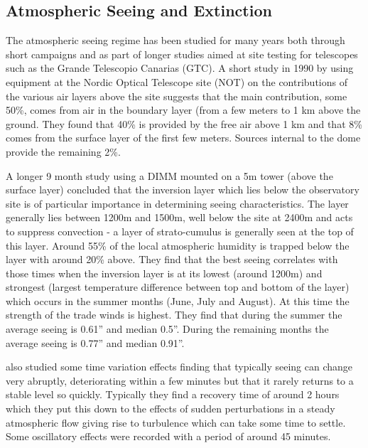 {{\subsection{Atmospheric Seeing and Extinction}  
\label{sect:sub_atmoseeing}
The atmospheric seeing regime has been studied for many years both through short campaigns and as part of longer studies aimed at site testing for telescopes such as the Grande Telescopio Canarias (GTC).
 A short study in 1990 by \citet{vernin92optical} using equipment at the Nordic Optical Telescope site (NOT) on the contributions of the various air layers above the site suggests that the main contribution, some 50\%, comes from air in the boundary layer (from a few meters to 1 km above the ground. They found that 40\% is provided by the free air above 1 km and that 8\% comes from the surface layer of the first few meters. Sources internal to the dome provide the remaining 2\%.

A longer 9 month study \citep{munoz97nighttime} using a DIMM mounted on a 5m tower (above the surface layer) concluded that the inversion layer which lies below the observatory site is of particular importance in determining seeing characteristics. The layer generally lies between 1200m and 1500m, well below the site at 2400m and acts to suppress convection - a layer of strato-cumulus is generally seen at the top of this layer. Around 55\% of the local atmospheric humidity is trapped below the layer with around 20\% above. They find that the best seeing correlates with those times when the inversion layer is at its lowest (around 1200m) and strongest (largest temperature difference between top and bottom of the layer) which occurs in the summer months (June, July and August). At this time the strength of the trade winds is highest. They find that during the summer the average seeing is 0.61'' and median 0.5''. During the remaining months the average seeing is 0.77'' and median 0.91''. 

\citet{munoz97nighttime} also studied some time variation effects finding that typically seeing can change very abruptly, deteriorating within a few minutes but that it rarely returns to a stable level so quickly. Typically they find a recovery time of around 2 hours which they put this down to the effects of sudden perturbations in a steady atmospheric flow giving rise to turbulence which can take some time to settle. Some oscillatory effects were recorded with a period of around 45 minutes. 

}}
